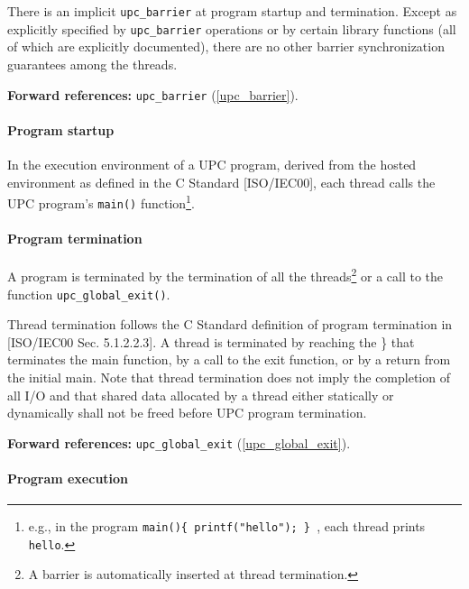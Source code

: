 \np There is an implicit {\tt upc\_barrier} at program startup
     and termination.  Except as explicitly specified by {\tt upc\_barrier} operations
     or by certain library functions (all of which are explicitly documented), there
     are no other barrier synchronization guarantees among the threads.

       {\bf Forward references:} {\tt upc\_barrier} (\ref{upc_barrier}).  

\paragraph{Program startup}

\npf In the execution environment of a UPC program, derived
      from the hosted environment as defined in the C Standard [ISO/IEC00],
      each thread calls the UPC program's {\tt main()}
      function\footnote {e.g., in the program {\tt main()\{
      printf("hello"); \} }, each thread prints {\tt hello}.}.

\paragraph{Program termination}

\npf A program is terminated by the termination of all the
      threads\footnote{A barrier is automatically inserted at thread termination.} or a call
      to the function {\tt upc\_global\_exit()}.

\np Thread termination follows the C Standard definition of
    program termination in [ISO/IEC00 Sec. 5.1.2.2.3]. A thread is
    terminated by reaching the \}  that terminates the main
    function, by a call to the exit function, or by a return from the
    initial main. Note that thread termination does not imply the
    completion of all I/O and that shared data allocated by a thread
    either statically or dynamically shall not be freed before UPC
    program termination.

     {\bf Forward references:} {\tt upc\_global\_exit} (\ref{upc_global_exit}).  

\paragraph{Program execution}
\label{strict_relaxed}

